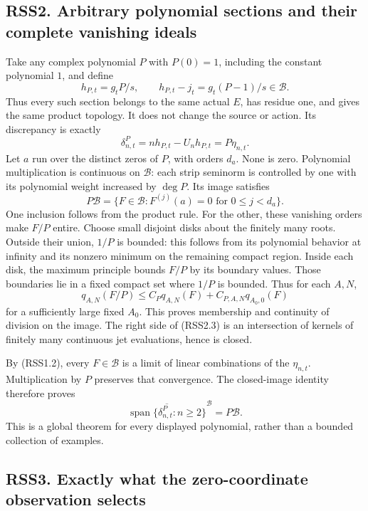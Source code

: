 \subsection{RSS2. Arbitrary polynomial sections and their complete
vanishing
ideals}\label{rss2.-arbitrary-polynomial-sections-and-their-complete-vanishing-ideals}

Take any complex polynomial \(P\) with \(P(0)=1\), including the
constant polynomial \(1\), and define \[
h_{P,t}=g_tP/s,\qquad
h_{P,t}-j_t=g_t(P-1)/s\in\mathcal B.
\tag{RSS2.1}
\] Thus every such section belongs to the same actual \(E\), has residue
one, and gives the same product topology. It does not change the source
or action. Its discrepancy is exactly \[
\delta^P_{n,t}=nh_{P,t}-U_nh_{P,t}=P\eta_{n,t}.
\tag{RSS2.2}
\] Let \(a\) run over the distinct zeros of \(P\), with orders \(d_a\).
None is zero. Polynomial multiplication is continuous on \(\mathcal B\):
each strip seminorm is controlled by one with its polynomial weight
increased by \(\deg P\). Its image satisfies \[
P\mathcal B=\{F\in\mathcal B:F^{(j)}(a)=0\text{ for }0\le j<d_a\}.
\tag{RSS2.3}
\] One inclusion follows from the product rule. For the other, these
vanishing orders make \(F/P\) entire. Choose small disjoint disks about
the finitely many roots. Outside their union, \(1/P\) is bounded: this
follows from its polynomial behavior at infinity and its nonzero minimum
on the remaining compact region. Inside each disk, the maximum principle
bounds \(F/P\) by its boundary values. Those boundaries lie in a fixed
compact set where \(1/P\) is bounded. Thus for each \(A,N\), \[
q_{A,N}(F/P)\le C_P q_{A,N}(F)+C_{P,A,N}q_{A_0,0}(F)
\tag{RSS2.4}
\] for a sufficiently large fixed \(A_0\). This proves membership and
continuity of division on the image. The right side of (RSS2.3) is an
intersection of kernels of finitely many continuous jet evaluations,
hence is closed.

By (RSS1.2), every \(F\in\mathcal B\) is a limit of linear combinations
of the \(\eta_{n,t}\). Multiplication by \(P\) preserves that
convergence. The closed-image identity therefore proves \[
\boxed{\overline{\operatorname{span}\{\delta^P_{n,t}:n\ge2\}}^{\mathcal B}=P\mathcal B.}
\tag{RSS2.5}
\] This is a global theorem for every displayed polynomial, rather than
a bounded collection of examples.

\subsection{RSS3. Exactly what the zero-coordinate observation
selects}\label{rss3.-exactly-what-the-zero-coordinate-observation-selects}

